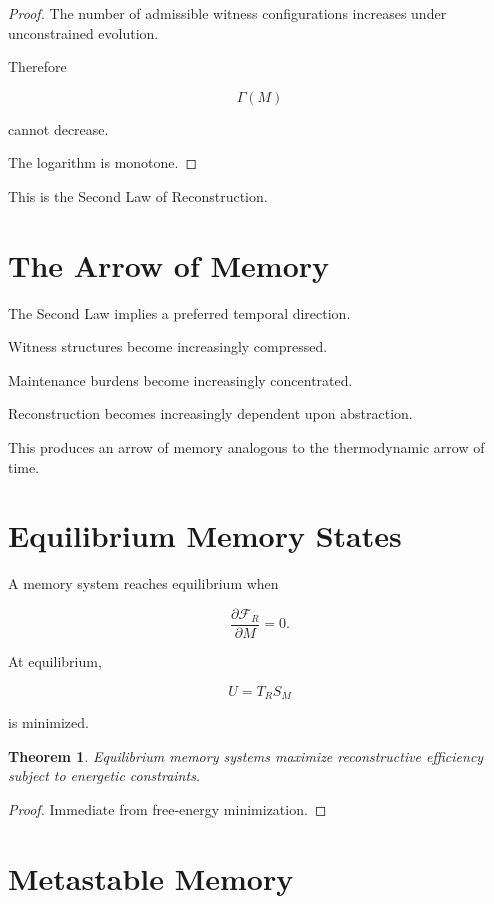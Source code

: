 \documentclass[12pt,oneside]{book}
\theoremstyle{plain} \newtheorem{theorem}{Theorem}[chapter] \newtheorem{lemma}[theorem]{Lemma} \newtheorem{proposition}[theorem]{Proposition} \newtheorem{corollary}[theorem]{Corollary}
\theoremstyle{definition} \newtheorem{definition}[theorem]{Definition} \newtheorem{axiom}[theorem]{Axiom} \newtheorem{construction}[theorem]{Construction}
\theoremstyle{remark} \newtheorem{remark}[theorem]{Remark} \newtheorem{example}[theorem]{Example}
\begin{document}
\begin{proof}

The number of admissible witness configurations increases under unconstrained evolution.

Therefore

\[
\Gamma(M)
\]

cannot decrease.

The logarithm is monotone.

\end{proof}

This is the Second Law of Reconstruction.

\section{The Arrow of Memory}

The Second Law implies a preferred temporal direction.

Witness structures become increasingly compressed.

Maintenance burdens become increasingly concentrated.

Reconstruction becomes increasingly dependent upon abstraction.

This produces an arrow of memory analogous to the thermodynamic arrow of time.

\section{Equilibrium Memory States}

A memory system reaches equilibrium when

\[
\frac{\partial \mathcal F_R}
{\partial M}
=
0. 

\]

At equilibrium,

\[
U
=
T_RS_M
\]

is minimized.

\begin{theorem}

Equilibrium memory systems maximize reconstructive efficiency subject to energetic constraints.

\end{theorem}

\begin{proof}

Immediate from free-energy minimization.

\end{proof}

\section{Metastable Memory}
\end{document}
